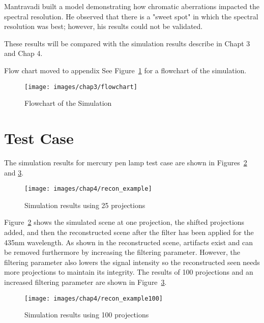 Mantravadi built a model demonstrating how chromatic aberrations impacted the spectral resolution. He observed that there is a "sweet spot" in which the spectral resolution was best; however, his results could not be validated.

These results will be compared with the simulation results describe in Chapt 3 and Chap 4.

Flow chart moved to appendix
See Figure~\ref{fig:simFlowChart} for a flowchart of the simulation.


\begin{figure}[htb]
\begin{center}
\texttt{[image: images/chap3/flowchart]}
\caption{Flowchart of the Simulation}
\label{fig:simFlowChart}
\end{center}
\end{figure}

\section{Test Case}

The simulation results for mercury pen lamp test case are shown in Figures~\ref{fig:simResults1} and \ref{fig:simResults2}. 

\begin{figure}[htb]
\begin{center}
\texttt{[image: images/chap4/recon\_example]}
\caption{Simulation results using 25 projections}
\label{fig:simResults1}
\end{center}
\end{figure}

Figure~\ref{fig:simResults1} shows the simulated scene at one projection, the shifted projections added, and then the reconstructed scene after the filter has been applied for the 435nm wavelength. As shown in the reconstructed scene, artifacts exist and can be removed furthermore by increasing the filtering parameter. However, the filtering parameter also lowers the signal intensity so the reconstructed seen needs more projections to maintain its integrity. The results of 100 projections and an increased filtering parameter are shown in Figure~\ref{fig:simResults2}.

\begin{figure}[htb]
\begin{center}
\texttt{[image: images/chap4/recon\_example100]}
\caption{Simulation results using 100 projections}
\label{fig:simResults2}
\end{center}
\end{figure}

